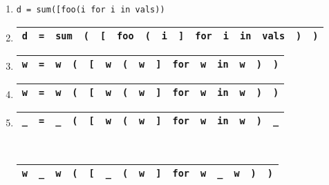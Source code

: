 \documentclass[sigplan,review,anonymous,acmsmall]{acmart}\settopmatter{printfolios=false,printccs=false,printacmref=false}
\begin{document}
  \begin{enumerate}[leftmargin=.23\linewidth]
    \item \texttt{d = sum([foo(i\err{]} for i in vals))}
    \item \begin{tabular}{|c|c|c|c|c|c|c|c|c|c|c|c|c|c|c|}
            \hline
            \texttt{d} & \texttt{=} & \texttt{sum} & \texttt{(} & \texttt{[} & \texttt{foo} & \texttt{(} & \texttt{i} & \texttt{]} & \texttt{for} & \texttt{i} & \texttt{in} & \texttt{vals} & \texttt{)} & \texttt{)} \\\hline
    \end{tabular}
    \item \begin{tabular}{|c|c|c|c|c|c|c|c|c|c|c|c|c|c|c|}
            \hline
            \texttt{w} & \texttt{=} & \texttt{w} & \texttt{(} & \texttt{[} & \texttt{w} & \texttt{(} & \texttt{w} & \texttt{]} & \texttt{for} & \texttt{w} & \texttt{in} & \texttt{w} & \texttt{)} & \texttt{)} \\\hline
    \end{tabular}
    \item \begin{tabular}{|||c|||c|||c|||c|||c|||c|||c|||c|||c|||c|||c|||c|||c|||c|||c|||}
            \hline
            \texttt{w} & \texttt{=} & \texttt{w} & \texttt{(} & \texttt{[} & \texttt{w} & \texttt{(} & \texttt{w} & \texttt{]} & \texttt{for} & \texttt{w} & \texttt{in} & \texttt{w} & \texttt{)} & \texttt{)} \\\hline
    \end{tabular}
    \item \begin{tabular}{|||c|||c|||c|||c|||c|||c|||c|||c|||c|||c|||c|||c|||c|||c|||c|||}
            \hline
            \cellcolor{black!15}\texttt{\_} & \texttt{=} & \cellcolor{black!15}\texttt{\_} & \texttt{(} & \texttt{[} & \texttt{w} & \texttt{(} & \texttt{w} & \texttt{]} & \texttt{for} & \texttt{w} & \texttt{in} & \texttt{w} & \texttt{)} & \cellcolor{black!15}\texttt{\_} \\\hline
    \end{tabular}\\
    \begin{tabular}{|||c|||c|||c|||c|||c|||c|||c|||c|||c|||c|||c|||c|||c|||c|||c|||}
      \hline
      \texttt{w} & \cellcolor{black!15}\texttt{\_} & \texttt{w} & \texttt{(} & \texttt{[} & \cellcolor{black!15}\texttt{\_} & \texttt{(} & \texttt{w} & \texttt{]} & \texttt{for} & \texttt{w} & \cellcolor{black!15}\texttt{\_} & \texttt{w} & \texttt{)} & \texttt{)} \\\hline

\end{tabular}
\end{enumerate}
\end{document}
